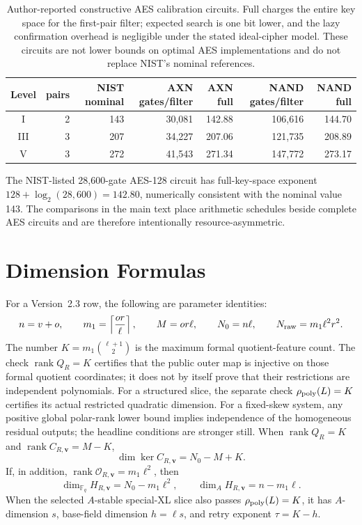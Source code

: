 \documentclass[11pt]{article}
\newcommand{\F}{\mathbb F}
\newcommand{\rank}{\operatorname{rank}}
\begin{document}
\begin{table}[H]
\centering
\caption{Author-reported constructive AES calibration circuits.  Full charges
the entire key space for the first-pair filter; expected search is one bit
lower, and the lazy confirmation overhead is negligible under the stated
ideal-cipher model.  These circuits are not lower bounds on optimal AES
implementations and do not replace NIST's nominal references.}
\label{tab:aes-calibration}
\scriptsize
\setlength{\tabcolsep}{3.5pt}
\begin{tabular}{@{}c r r r r r r@{}}
\toprule
Level & pairs & NIST nominal & AXN gates/filter & AXN full & NAND gates/filter & NAND full\\
\midrule
I   & 2 & 143 & 30,081 & 142.88 & 106,616 & 144.70\\
III & 3 & 207 & 34,227 & 207.06 & 121,735 & 208.89\\
V   & 3 & 272 & 41,543 & 271.34 & 147,772 & 273.17\\
\bottomrule
\end{tabular}
\end{table}

The NIST-listed 28,600-gate AES-128 circuit has full-key-space exponent
$128+\log_2(28{,}600)=142.80$, numerically consistent with the nominal value
143.  The comparisons in the main text place arithmetic schedules beside
complete AES circuits and are therefore intentionally resource-asymmetric.

\section{Dimension Formulas}\label{app:dimensions}

For a Version~2.3 row, the following are parameter identities:
\[
 n=v+o,
 \qquad m_1=\left\lceil\frac{or}{\ell}\right\rceil,
 \qquad M=or\ell,
 \qquad N_0=n\ell,
 \qquad N_{\rm raw}=m_1\ell^2r^2.
\]
The number
$K=m_1\binom{\ell+1}{2}$ is the maximum formal quotient-feature count.
The check $\rank Q_R=K$ certifies that the public outer map is injective on
those formal quotient coordinates; it does not by itself prove that their
restrictions are independent polynomials.  For a structured slice, the
separate check $\rho_{\rm poly}(L)=K$ certifies its actual restricted
quadratic dimension.  For a fixed-skew system, any positive global polar-rank
lower bound implies independence of the homogeneous residual outputs; the
headline conditions are stronger still.  When
$\rank Q_R=K$ and $\rank C_{R,\mathbf v}=M-K$,
\[
 \dim\ker C_{R,\mathbf v}=N_0-M+K.
\]
If, in addition, $\rank\mathcal O_{R,\mathbf v}=m_1\ell^2$, then
\[
 \dim_{\F_q}H_{R,\mathbf v}=N_0-m_1\ell^2,
 \qquad
 \dim_A H_{R,\mathbf v}=n-m_1\ell.
\]
When the selected $A$-stable special-XL slice also passes
$\rho_{\rm poly}(L)=K$, it has $A$-dimension $s$, base-field dimension
$h=\ell s$, and retry exponent $\tau=K-h$.
\end{document}
